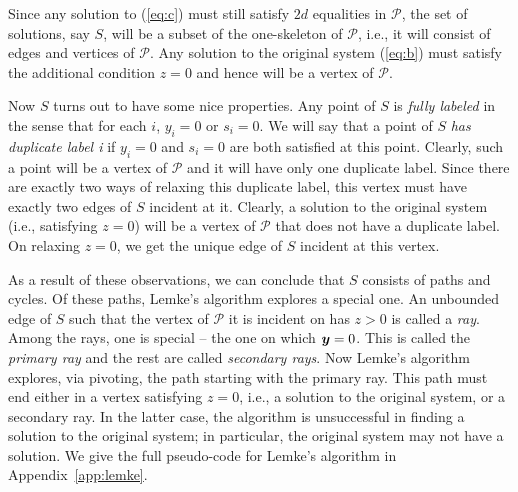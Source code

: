 \documentclass[a4paper,UKenglish]{lipics2}
\theoremstyle{definition}
\newcommand{\CPol}{\mbox{${\mathcal P}$}}
\newcommand{\yy}{\mbox{\boldmath $y$}}
\newcommand{\one}{\mbox{\boldmath $1$}}
\newcommand{\pq}{\mbox{\boldmath $q$}}
\begin{document}
Since any solution to (\ref{eq:c}) must still satisfy $2d$ equalities in $\CPol$, the set of solutions, say
$S$, will be a subset of the one-skeleton of $\CPol$, i.e., it will consist of edges and vertices of $\CPol$.  Any solution to
the original system (\ref{eq:b}) must satisfy the additional condition $z = 0$ and hence will be a vertex of $\CPol$.



Now $S$ turns out to have some nice properties. Any point of $S$ is {\em fully labeled} in the sense that for each $i$, $y_i
= 0$ or $s_i = 0$.  We will say that a point of $S$ {\em has duplicate label i} if $y_i = 0$ and $s_i = 0$ are both satisfied
at this point. Clearly, such a point will be a vertex of $\CPol$ and it will have only one duplicate label.  Since there are
exactly two ways of relaxing this duplicate label, this vertex must have exactly two edges of $S$ incident at it.  Clearly, a
solution to the original system (i.e., satisfying $z = 0$) will be a vertex of $\CPol$ that does not have a duplicate label.  On
relaxing $z=0$, we get the unique edge of $S$ incident at this vertex.

As a result of these observations, we can conclude that $S$ consists of paths and cycles.  Of these paths, Lemke's algorithm
explores a special one.  An unbounded edge of $S$ such that the vertex of $\CPol$ it is incident on has $z > 0$ is called a
{\em ray}.  Among the rays, one is special -- the one on which $\yy = 0$. This is called the {\em primary ray} and the rest
are called {\em secondary rays}. Now Lemke's algorithm explores, via pivoting, the path starting with the primary ray. This
path must end either in a vertex satisfying $z = 0$, i.e., a solution to the original system, or a secondary ray. In the
latter case, the algorithm is unsuccessful in finding a solution to the original system; in particular, the original system
may not have a solution.  
We give the full pseudo-code for Lemke's algorithm in Appendix~\ref{app:lemke}.

\end{document}
